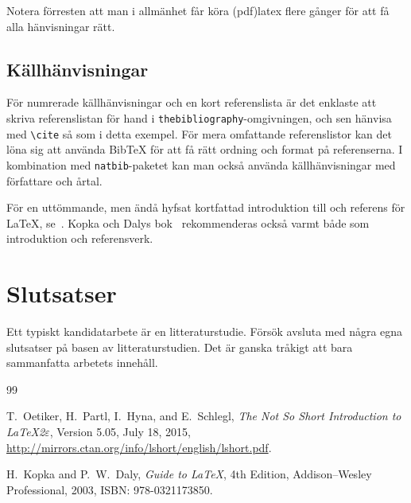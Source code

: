 \documentclass[swedish, 12pt, a4paper, elec, utf8, a-2b, online]{aaltothesis}
\begin{document}
Notera förresten att man i allmänhet får köra (pdf)latex flere gånger för
att få alla hänvisningar rätt.

\subsection{Källhänvisningar}

För numrerade källhänvisningar och en kort referenslista är det enklaste
att skriva referenslistan för hand i \verb|thebibliography|-omgivningen,
och sen hänvisa med \verb|\cite| så som i detta exempel. För mera
omfattande referenslistor kan det löna sig att använda BibTeX för att få
rätt ordning och format på referenserna. I kombination med
\verb|natbib|-paketet kan man också använda källhänvisningar med författare
och årtal.

För en uttömmande, men ändå hyfsat kortfattad introduktion till och
referens för \LaTeX, se~\cite{lshort}. Kopka och Dalys
bok~\cite{kopka_daly} rekommenderas också varmt både som introduktion
och referensverk.

\clearpage
\section{Slutsatser}

Ett typiskt kandidatarbete är en litteraturstudie. Försök avsluta med några
egna slutsatser på basen av litteraturstudien. Det är ganska tråkigt att
bara sammanfatta arbetets innehåll.



\clearpage
\thesisbibliography
\begin{thebibliography}{99}

 T.\ Oetiker, H.\ Partl, I.\ Hyna, and E.\ Schlegl,
  \emph{The Not So Short Introduction to \LaTeX 2$\varepsilon$},
  Version 5.05, July 18, 2015,
  \url{http://mirrors.ctan.org/info/lshort/english/lshort.pdf}.

 H.\ Kopka and P.\ W.\ Daly, \emph{Guide to
    \LaTeX}, 4th Edition, Addison--Wesley Professional, 2003, ISBN:
  978-0321173850.

\end{thebibliography}

\end{document}

